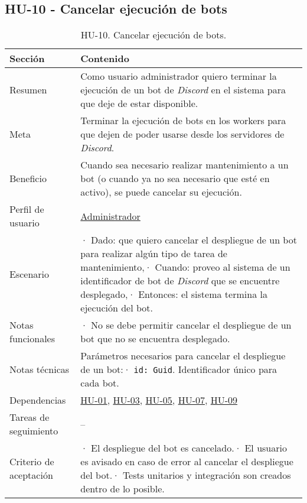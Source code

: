 \subsection{HU-10 - Cancelar ejecución de bots}
\label{sec:hu10}

\begin{table}[H]
    \centering
    \def\arraystretch{1.25}
    \begin{adjustbox}{max width=\textwidth}
    \begin{tabularx}{\textwidth}{|l|L|}
    \hline
        \textbf{Sección} & \textbf{Contenido} \\ \hline
    \hline
        Resumen & Como usuario administrador quiero terminar la ejecución de un bot de \textit{Discord} en el sistema para que deje de estar disponible. \\ \hline
        Meta & Terminar la ejecución de bots en los workers para que dejen de poder usarse desde los servidores de \textit{Discord}. \\ \hline
        Beneficio & Cuando sea necesario realizar mantenimiento a un bot (o cuando ya no sea necesario que esté en activo), se puede cancelar su ejecución. \\ \hline
        Perfil de usuario & \hyperref[sec:personaAdmin]{Administrador} \\ \hline
        Escenario & · Dado: que quiero cancelar el despliegue de un bot para realizar algún tipo de tarea de mantenimiento,\linebreak · Cuando: proveo al sistema de un identificador de bot de \textit{Discord} que se encuentre desplegado,\linebreak · Entonces: el sistema termina la ejecución del bot. \\ \hline
        Notas funcionales & · No se debe permitir cancelar el despliegue de un bot que no se encuentra desplegado. \\ \hline
        Notas técnicas & Parámetros necesarios para cancelar el despliegue de un bot:\linebreak · \verb|id: Guid|. Identificador único para cada bot. \\ \hline
        Dependencias & \hyperref[sec:hu01]{HU-01}, \hyperref[sec:hu03]{HU-03}, \hyperref[sec:hu05]{HU-05}, \hyperref[sec:hu07]{HU-07}, \hyperref[sec:hu09]{HU-09} \\ \hline
        Tareas de seguimiento & – \\ \hline
        Criterio de aceptación & · El despliegue del bot es cancelado.\linebreak · El usuario es avisado en caso de error al cancelar el despliegue del bot.\linebreak · Tests unitarios y integración son creados dentro de lo posible. \\ \hline
    \end{tabularx}
    \end{adjustbox}
    \caption{HU-10. Cancelar ejecución de bots.}
\end{table}

